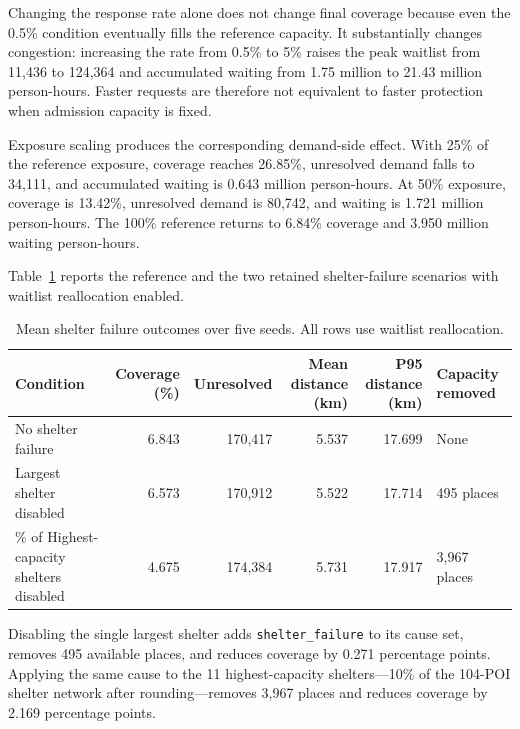 Changing the response rate alone does not change final coverage because even the 0.5\% condition eventually fills the reference capacity. It substantially changes congestion: increasing the rate from 0.5\% to 5\% raises the peak waitlist from 11,436 to 124,364 and accumulated waiting from 1.75 million to 21.43 million person-hours. Faster requests are therefore not equivalent to faster protection when admission capacity is fixed.

Exposure scaling produces the corresponding demand-side effect. With 25\% of the reference exposure, coverage reaches 26.85\%, unresolved demand falls to 34,111, and accumulated waiting is 0.643 million person-hours. At 50\% exposure, coverage is 13.42\%, unresolved demand is 80,742, and waiting is 1.721 million person-hours. The 100\% reference returns to 6.84\% coverage and 3.950 million waiting person-hours.

Table~\ref{tbl:shelter_failures} reports the reference and the two retained shelter-failure scenarios with waitlist reallocation enabled.

\begin{table}[ht]
\centering
\footnotesize
\caption{Mean shelter failure outcomes over five seeds. All rows use waitlist reallocation.}
\label{tbl:shelter_failures}
\begin{tabularx}{\linewidth}{@{}>{\raggedright\arraybackslash}Xrrrrl@{}}
\toprule
\textbf{Condition} &
\shortstack{\textbf{Coverage}\\\textbf{(\%)}} &
\textbf{Unresolved} &
\shortstack{\textbf{Mean distance}\\\textbf{(km)}} &
\shortstack{\textbf{P95 distance}\\\textbf{(km)}} &
\textbf{Capacity removed} \\
\midrule
No shelter failure        & 6.843 & 170,417 & 5.537 & 17.699 & None \\
Largest shelter disabled  & 6.573 & 170,912 & 5.522 & 17.714 & 495 places \\
10\% of Highest-capacity shelters disabled & 4.675 & 174,384 & 5.731 & 17.917 & 3,967 places \\
\bottomrule
\end{tabularx}
\end{table}

Disabling the single largest shelter adds \texttt{shelter\_failure} to its cause set, removes 495 available places, and reduces coverage by 0.271 percentage points. Applying the same cause to the 11 highest-capacity shelters---10\% of the 104-POI shelter network after rounding---removes 3,967 places and reduces coverage by 2.169 percentage points.

